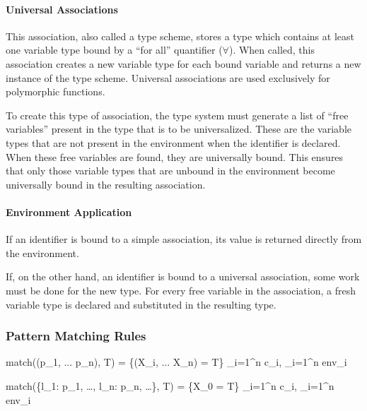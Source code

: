 \documentclass{article}
\begin{document}
\paragraph{Universal Associations}
This association, also called a type scheme, stores a type which contains at least one variable type bound by a ``for all'' quantifier ($\forall$).
When called, this association creates a new variable type for each bound variable and returns a new instance of the type scheme.
Universal associations are used exclusively for polymorphic functions.

To create this type of association, the type system must generate a list of ``free variables'' present in the type that is to be universalized.
These are the variable types that are not present in the environment when the identifier is declared.
When these free variables are found, they are universally bound.
This ensures that only those variable types that are unbound in the environment become universally bound in the resulting association.

\paragraph{Environment Application}

If an identifier is bound to a simple association, its value is returned directly from the environment.

If, on the other hand, an identifier is bound to a universal association, some work must be done for the new  type.
For every free variable in the association, a fresh variable type is declared and substituted in the resulting type.

\subsubsection{Pattern Matching Rules}




    {match((p_1, ... p_n), T) = \{(X_i, ... X_n) = T\} \cup \displaystyle \bigcup_{i=1}^{n} c_i, \displaystyle \bigcup_{i=1}^{n} env_i}

    {match(\{l_1: p_1, \dots, l_n: p_n, \dots\}, T) = \{X_0 = T\} \cup \displaystyle \bigcup_{i=1}^{n} c_i, \displaystyle \bigcup_{i=1}^{n} env_i}
\end{document}
